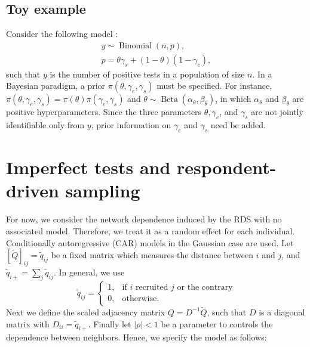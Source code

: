 \subsection{Toy example}

Consider the following model \cite{gelman2020bayesian}:
\begin{gather*}
  y \sim \operatorname{Binomial}(n, p), \\
  p = \theta\gamma_s + (1- \theta)(1-\gamma_e), 
\end{gather*}
such that $y$ is the number of positive tests in a population of size $n$. In
a Bayesian paradigm, a prior $\pi(\theta, \gamma_e, \gamma_s)$ must be
specified. For instance, $\pi(\theta, \gamma_e, \gamma_s) =
\pi(\theta)\pi(\gamma_e, \gamma_s)$ and $\theta \sim
\operatorname{Beta}(\alpha_{\theta}, \beta_{\theta})$, in which
$\alpha_{\theta}$ and $\beta_{\theta}$ are positive hyperparameters. Since the
three parameters $\theta, \gamma_e$, and $\gamma_s$ are not jointly
identifiable only from $y$, prior information on $\gamma_e$ and $\gamma_s$
need be added. 

\section{Imperfect tests and respondent-driven sampling}

For now, we consider the network dependence induced by the RDS with no
associated model. Therefore, we treat it as a random effect for
each individual. Conditionally autoregressive (CAR) models in the
Gaussian case are used. Let $[\tilde{Q}]_{ij} = \tilde{q}_{ij}$ be a fixed matrix which measures the distance between $i$
and $j$, and $\tilde{q}_{i+} = \sum_{j} \tilde{q}_{ij}$. In general, we use
$$
\tilde{q}_{ij} = \begin{cases}
  1, &\text{if } i \text{ recruited } j \text{ or the contrary} \\
  0, &\text{otherwise.} 
\end{cases}
$$
Next we define the scaled adjacency matrix $Q = D^{-1}\tilde{Q}$, such that $D$
is a diagonal matrix with $D_{ii} = \tilde{q}_{i+}$. Finally let $|\rho| < 1$ be a
parameter to controls the dependence between neighbors. Hence, we specify the
model as follows:

